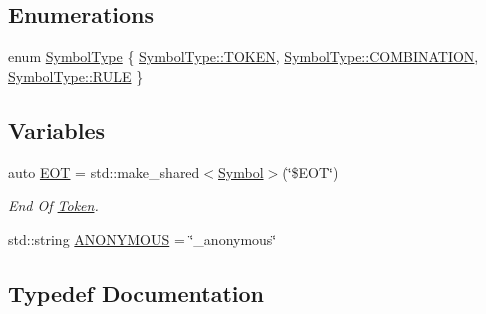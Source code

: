 \subsection*{Enumerations}
\begin{DoxyCompactItemize}
\item 
enum \mbox{\hyperlink{namespace_erable_1_1_compiler_1_1_symbols_a3b60ec10cda0920ec4368128361b8320}{Symbol\+Type}} \{ \mbox{\hyperlink{namespace_erable_1_1_compiler_1_1_symbols_a3b60ec10cda0920ec4368128361b8320a94c8aa2452bccd82ee129b46f7c4be79}{Symbol\+Type\+::\+T\+O\+K\+EN}}, 
\mbox{\hyperlink{namespace_erable_1_1_compiler_1_1_symbols_a3b60ec10cda0920ec4368128361b8320a45b476684f4bd61fc6bba89a63c15696}{Symbol\+Type\+::\+C\+O\+M\+B\+I\+N\+A\+T\+I\+ON}}, 
\mbox{\hyperlink{namespace_erable_1_1_compiler_1_1_symbols_a3b60ec10cda0920ec4368128361b8320a2dfa0f84a44043dca0cd209721123afa}{Symbol\+Type\+::\+R\+U\+LE}}
 \}
\end{DoxyCompactItemize}
\subsection*{Variables}
\begin{DoxyCompactItemize}
\item 
auto \mbox{\hyperlink{namespace_erable_1_1_compiler_1_1_symbols_a3b63037427c62704cfddfbb43310e962}{E\+OT}} = std\+::make\+\_\+shared$<$\mbox{\hyperlink{class_erable_1_1_compiler_1_1_symbols_1_1_symbol}{Symbol}}$>$(\char`\"{}\$E\+OT\char`\"{})
\begin{DoxyCompactList}\small\item\em End Of \mbox{\hyperlink{struct_token}{Token}}. \end{DoxyCompactList}\item 
std\+::string \mbox{\hyperlink{namespace_erable_1_1_compiler_1_1_symbols_a6785648fe98446332490a11ff9abdd08}{A\+N\+O\+N\+Y\+M\+O\+US}} = \char`\"{}\+\_\+anonymous\char`\"{}
\end{DoxyCompactItemize}


\subsection{Typedef Documentation}
\mbox{\label{namespace_erable_1_1_compiler_1_1_symbols_ad3326e636860b0452468de51ed673c8a}} 
